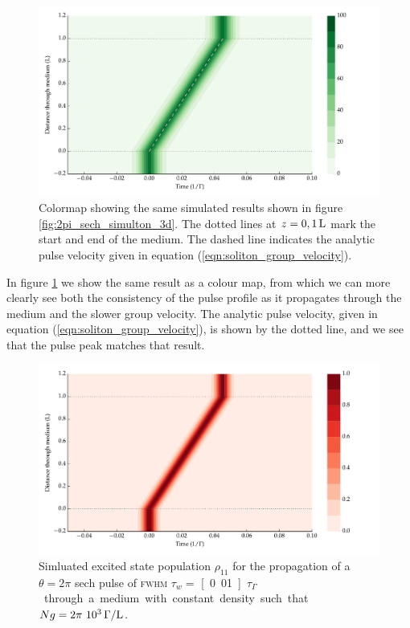     \begin{figure}[]
      \includegraphics[width=\linewidth]
        {figs/03_nonlinear/coh_sech_2_0pi_fwhm0_010_Ng01000_fig1.pdf}
      \caption{
      Colormap showing the same simulated results shown in figure
      \ref{fig:2pi_sech_simulton_3d}. The dotted lines at $z = \unit[0, 1]{L}$
      mark the start and end of the medium. The dashed line indicates the
      analytic pulse velocity given in equation
      (\ref{eqn:soliton_group_velocity}).
      }
      \label{fig:2pi_sech_simulton}
    \end{figure}

    In figure \ref{fig:2pi_sech_simulton} we show the same result as a colour
    map, from which we can more clearly see both the consistency of the pulse
    profile as it propagates through the medium and the slower group velocity.
    The analytic pulse velocity, given in equation
    (\ref{eqn:soliton_group_velocity}), is shown by the dotted line, and we see
    that the pulse peak matches that result.

    \begin{figure}[]
      \includegraphics[width=\linewidth]
        {figs/03_nonlinear/coh_sech_2_0pi_fwhm0_010_Ng01000_fig2.pdf}
      \caption{
        Simluated excited state population $\rho_{11}$ for the propagation of a
        $\theta = 2\pi$ sech pulse of \textsc{fwhm} $\tau_w = $
        \unit[0.01]{$\tau_\Gamma$} through a medium with constant density such
        that $Ng = \unit[2\pi~10^3]{\Gamma/L}$.
      }
      \label{fig:2pi_sech_simulton_pop}
    \end{figure}

